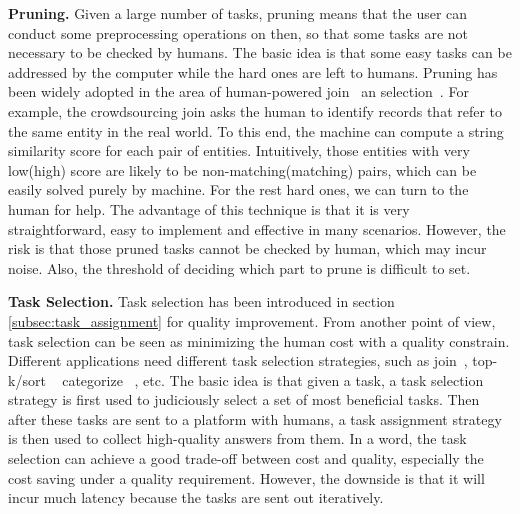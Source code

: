 \textbf{Pruning.} 
Given a large number of tasks,  pruning means that the user can conduct some preprocessing operations on then, so that some tasks are not necessary to be checked by humans. The basic idea is that some easy tasks can be addressed by the computer while the hard ones are left to humans. Pruning has been widely adopted in the area of human-powered join~\cite{DBLP:zencrowd, DBLP:crowder, DBLP:transitivity, DBLP:journals/vldb/ChaiLLDF18, DBLP:conf/sigmod/ChaiLLDF16} an selection~\cite{DBLP:conf/mobisys/YanKG10}. For example, the  crowdsourcing join asks the human to identify records that refer to the same entity in the real world. To this end, the machine can compute a string similarity score for each pair of entities. Intuitively, those entities with very low(high) score are likely to be non-matching(matching) pairs, which can be easily solved purely by machine. For the rest hard ones, we can turn to the human for help.
The advantage of this technique is that it is very straightforward, easy to implement and effective in many scenarios. However, the risk is that those pruned tasks cannot be checked by human, which may incur noise. Also, the threshold of deciding which part to prune is difficult to set.



\textbf{Task Selection.}
Task selection has been introduced in section \ref{subsec:task_assignment} for quality improvement. From another point of view, task selection can be seen as minimizing the human cost with a quality constrain. 
Different  applications need different task selection strategies, such as join~\cite{DBLP:zencrowd, DBLP:crowder, DBLP:transitivity, DBLP:journals/vldb/ChaiLLDF18, DBLP:conf/sigmod/ChaiLLDF16}, top-k/sort ~\cite{DBLP:conf/sigmod/GuoPG12, DBLP:conf/sigmod/LiZ018} categorize ~\cite{DBLP:journals/pvldb/ParameswaranSGPW11}, etc.  The basic idea is that given a task, a task selection strategy is first used to judiciously select a set of most beneficial tasks. Then after these tasks are sent to a  platform with humans, a task assignment strategy is then used to collect high-quality answers from them. In a word, the task selection can achieve a good trade-off between cost and quality, especially the cost saving under a quality requirement. However, the downside is that it will incur much latency because the tasks are sent out iteratively.



